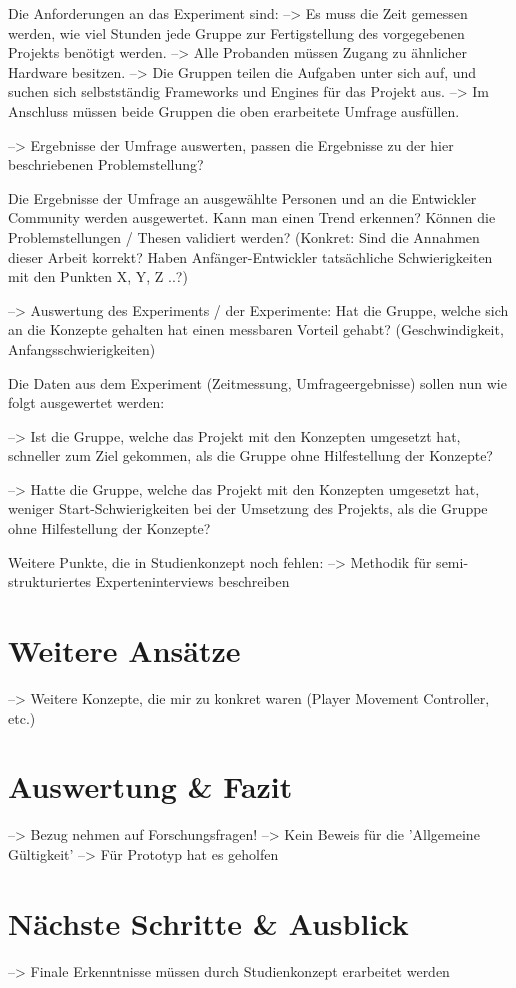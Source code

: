Die Anforderungen an das Experiment sind:
--> Es muss die Zeit gemessen werden, wie viel Stunden jede Gruppe zur Fertigstellung des vorgegebenen Projekts benötigt werden.
--> Alle Probanden müssen Zugang zu ähnlicher Hardware besitzen.
--> Die Gruppen teilen die Aufgaben unter sich auf, und suchen sich selbstständig Frameworks und Engines für das Projekt aus.
--> Im Anschluss müssen beide Gruppen die oben erarbeitete Umfrage ausfüllen.


--> Ergebnisse der Umfrage auswerten, passen die Ergebnisse zu der hier beschriebenen Problemstellung?

Die Ergebnisse der Umfrage an ausgewählte Personen und an die Entwickler Community werden ausgewertet. Kann man einen Trend erkennen? Können die Problemstellungen / Thesen validiert werden? 
(Konkret: Sind die Annahmen dieser Arbeit korrekt? Haben Anfänger-Entwickler tatsächliche Schwierigkeiten mit den Punkten X, Y, Z ..?)

--> Auswertung des Experiments / der Experimente: Hat die Gruppe, welche sich an die Konzepte gehalten hat einen messbaren Vorteil gehabt? (Geschwindigkeit, Anfangsschwierigkeiten)

Die Daten aus dem Experiment (Zeitmessung, Umfrageergebnisse) sollen nun wie folgt ausgewertet werden:

--> Ist die Gruppe, welche das Projekt mit den Konzepten umgesetzt hat, schneller zum Ziel gekommen, als die Gruppe ohne Hilfestellung der Konzepte?

--> Hatte die Gruppe, welche das Projekt mit den Konzepten umgesetzt hat, weniger Start-Schwierigkeiten bei der Umsetzung des Projekts, als die Gruppe ohne Hilfestellung der Konzepte?


Weitere Punkte, die in Studienkonzept noch fehlen:
--> Methodik für semi-strukturiertes Experteninterviews beschreiben

\section{Weitere Ansätze}

--> Weitere Konzepte, die mir zu konkret waren (Player Movement Controller, etc.)

\section{Auswertung \& Fazit}

--> Bezug nehmen auf Forschungsfragen!
--> Kein Beweis für die 'Allgemeine Gültigkeit'
--> Für Prototyp hat es geholfen

\section{Nächste Schritte \& Ausblick}

--> Finale Erkenntnisse müssen durch Studienkonzept erarbeitet werden